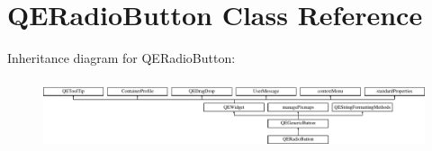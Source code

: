 \hypertarget{classQERadioButton}{
\section{QERadioButton Class Reference}
\label{classQERadioButton}
}
Inheritance diagram for QERadioButton:\begin{figure}[H]
\begin{center}
\leavevmode
\includegraphics[height=2.097378cm]{classQERadioButton}
\end{center}
\end{figure}
